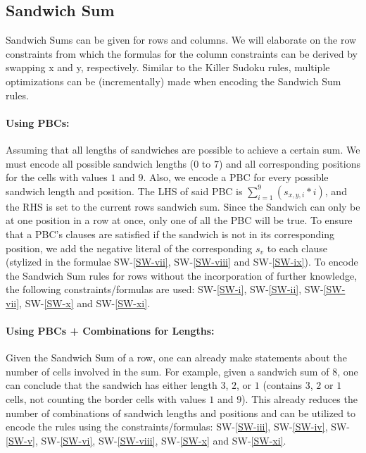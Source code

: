 \FloatBarrier
\newpage
\subsection{Sandwich Sum}
Sandwich Sums can be given for rows and columns. We will elaborate on the row constraints from which the formulas for the column constraints can be derived by swapping x and y, respectively. Similar to the Killer Sudoku rules, multiple optimizations can be (incrementally) made when encoding the Sandwich Sum rules.

\paragraph{Using PBCs:} Assuming that all lengths of sandwiches are possible to achieve a certain sum. We must encode all possible sandwich lengths ($0$ to $7$) and all corresponding positions for the cells with values $1$ and $9$. Also, we encode a PBC for every possible sandwich length and position. The LHS of said PBC is $\sum_{i=1}^{9} (s_{x,y,i}*i)$, and the RHS is set to the current rows sandwich sum. Since the Sandwich can only be at one position in a row at once, only one of all the PBC will be true. To ensure that a PBC's clauses are satisfied if the sandwich is not in its corresponding position, we add the negative literal of the corresponding $s_v$ to each clause (stylized in the formulae SW-\ref{SW-vii}, SW-\ref{SW-viii} and SW-\ref{SW-ix}). To encode the Sandwich Sum rules for rows without the incorporation of further knowledge, the following constraints/formulas are used: SW-\ref{SW-i}, SW-\ref{SW-ii}, SW-\ref{SW-vii}, SW-\ref{SW-x} and SW-\ref{SW-xi}.

\paragraph{Using PBCs + Combinations for Lengths:} Given the Sandwich Sum of a row, one can already make statements about the number of cells involved in the sum. For example, given a sandwich sum of $8$, one can conclude that the sandwich has either length $3$, $2$, or $1$ (contains $3$, $2$ or $1$ cells, not counting the border cells with values $1$ and $9$). This already reduces the number of combinations of sandwich lengths and positions and can be utilized to encode the rules using the constraints/formulas: SW-\ref{SW-iii}, SW-\ref{SW-iv}, SW-\ref{SW-v}, SW-\ref{SW-vi}, SW-\ref{SW-viii}, SW-\ref{SW-x} and SW-\ref{SW-xi}.

